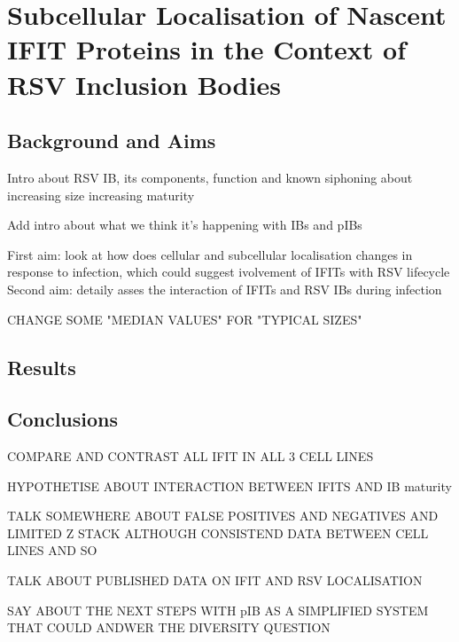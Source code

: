 \chapter{Subcellular Localisation of Nascent IFIT Proteins in the Context of RSV Inclusion Bodies} \label{ch:Subcellular Localisation of Nascent IFIT Proteins in the Context of RSV Inclusion Bodies}
\section{Background and Aims} \label{sec:Background and Aims-Chapter3}
Intro about RSV IB, its components, function and known siphoning about increasing size increasing maturity


Add intro about what we think it's happening with IBs and pIBs


First aim: look at how does cellular and subcellular localisation changes in response to infection, which could suggest ivolvement of IFITs with RSV lifecycle
Second aim: detaily asses the interaction of IFITs and RSV IBs during infection

CHANGE SOME "MEDIAN VALUES" FOR "TYPICAL SIZES"

\section{Results} \label{sec:Results-Chapter3}



\section{Conclusions} \label{sec:Conclusions-Chapter3}
COMPARE AND CONTRAST ALL IFIT IN ALL 3 CELL LINES

HYPOTHETISE ABOUT INTERACTION BETWEEN IFITS AND IB maturity

TALK SOMEWHERE ABOUT FALSE POSITIVES AND NEGATIVES AND LIMITED Z STACK 
ALTHOUGH CONSISTEND DATA BETWEEN CELL LINES AND SO

TALK ABOUT PUBLISHED DATA ON IFIT AND RSV LOCALISATION


SAY ABOUT THE NEXT STEPS WITH pIB AS A SIMPLIFIED SYSTEM THAT COULD ANDWER THE DIVERSITY QUESTION


